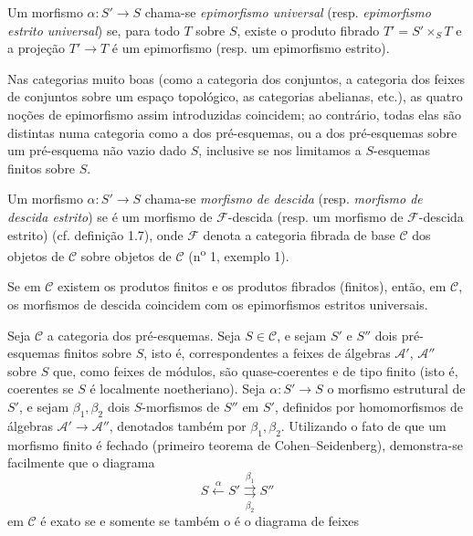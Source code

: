  Um morfismo $\alpha:S'\longrightarrow S$ chama-se
\emph{epimorfismo universal} (resp. \emph{epimorfismo estrito universal}) se,
para todo $T$ sobre $S$, existe o produto fibrado $T'=S'\times_ST$ e a
projeção $T'\longrightarrow T$ é um epimorfismo (resp. um epimorfismo
estrito).

Nas categorias muito boas (como a categoria dos conjuntos, a
categoria dos feixes de conjuntos sobre um espaço topológico, as categorias
abelianas, etc.), as quatro noções de epimorfismo assim introduzidas
coincidem; ao contrário, todas elas são distintas numa categoria como
a dos pré-esquemas, ou a dos pré-esquemas sobre um pré-esquema não vazio
dado $S$, inclusive se nos limitamos a $S$-esquemas finitos sobre $S$.

 Um morfismo $\alpha:S'\longrightarrow S$ chama-se
\emph{morfismo de descida} (resp. \emph{morfismo de descida estrito}) se é
um morfismo de $\mathcal F$-descida (resp. um morfismo de
$\mathcal F$-descida estrito) (cf. definição 1.7), onde $\mathcal F$ denota
a categoria fibrada de base $\mathcal C$ dos objetos de $\mathcal C$ sobre
objetos de $\mathcal C$ (n\textsuperscript{o} 1, exemplo 1).

 Se em $\mathcal C$ existem os produtos finitos e
os produtos fibrados (finitos), então, em $\mathcal C$, os morfismos de
descida coincidem com os epimorfismos estritos universais.

 Seja $\mathcal C$ a categoria dos pré-esquemas. Seja
$S\in\mathcal C$, e sejam $S'$ e $S''$ dois pré-esquemas finitos sobre $S$,
isto é, correspondentes a feixes de álgebras $\mathcal A'$, $\mathcal A''$
sobre $S$ que, como feixes de módulos, são quase-coerentes e de tipo finito
(isto é, coerentes se $S$ é localmente noetheriano). Seja
$\alpha:S'\longrightarrow S$ o morfismo estrutural de $S'$, e sejam
$\beta_1,\beta_2$ dois $S$-morfismos de $S''$ em $S'$, definidos por
homomorfismos de álgebras $\mathcal A'\longrightarrow\mathcal A''$, denotados
também por $\beta_1,\beta_2$. Utilizando o fato de que um morfismo finito é
fechado (primeiro teorema de Cohen--Seidenberg), demonstra-se facilmente que o
diagrama
\[
  \tag{+}
  S\xleftarrow{\alpha}S'
  \overset{\beta_1}{\underset{\beta_2}{\rightrightarrows}}S''
\]
em $\mathcal C$ é exato se e somente se também o é o diagrama de feixes

